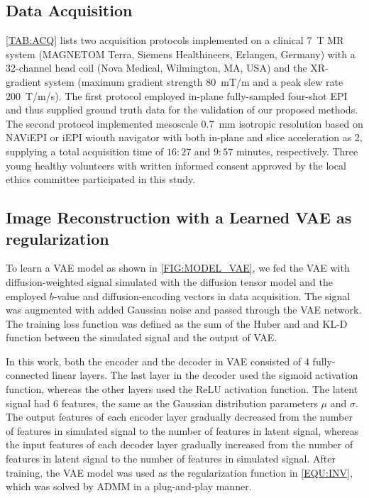 \documentclass[journal,twoside,web]{ieeecolor}
\begin{document}
	\subsection{Data Acquisition}

    \cref{TAB:ACQ} lists two acquisition protocols implemented on
	a clinical \SI{7}{\tesla} MR system
	(MAGNETOM Terra, Siemens Healthineers, Erlangen, Germany)
	with a 32-channel head coil (Nova Medical, Wilmington, MA, USA)
	and the XR-gradient system
	(maximum gradient strength \SI{80}{\milli\tesla/\meter} and
	a peak slew rate \SI{200}{\tesla/\meter/\second}).
    The first protocol employed in-plane fully-sampled four-shot EPI
    and thus supplied ground truth data for the validation
    of our proposed methods.
    The second protocol implemented mesoscale \SI{0.7}{mm}
    isotropic resolution based on NAViEPI or iEPI wiouth navigator
    with both in-plane and slice acceleration as 2,
	supplying a total acquisition time of $16:27$ and $9:57$ minutes, respectively.
    Three young healthy volunteers with written informed consent
	approved by the local ethics committee
	participated in this study.


	\subsection{Image Reconstruction with a Learned VAE as regularization}

	To learn a VAE model as shown in \cref{FIG:MODEL_VAE},
	we fed the VAE with diffusion-weighted signal simulated
	with the diffusion tensor model \cite{basser_1994_dmri} and
	the employed $b$-value and diffusion-encoding vectors in data acquisition.
	The signal was augmented with added Gaussian noise and passed through the VAE network.
	The training loss function was defined as the sum of the Huber and and KL-D function
	between the simulated signal and the output of VAE.

	In this work, both the encoder and the decoder in VAE consisted of
	4 fully-connected linear layers.
	The last layer in the decoder used the sigmoid activation function,
	whereas the other layers used the ReLU activation function.
	The latent signal had 6 features,
	the same as the Gaussian distribution parameters $\mu$ and $\sigma$.
	The output features of each encoder layer gradually decreased
	from the number of features in simulated signal
	to the number of features in latent signal,
	whereas the input features of each decoder layer gradually increased
	from the number of features in latent signal to the number of features in simulated signal.
	After training, the VAE model was used as the regularization function in \cref{EQU:INV},
	which was solved by ADMM in a plug-and-play manner.
\end{document}
